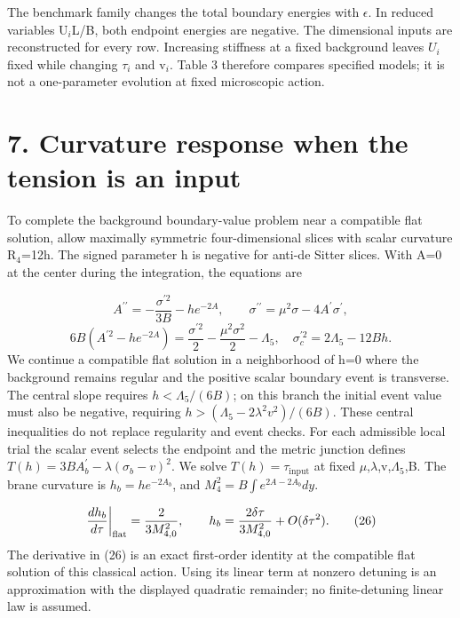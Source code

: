 \documentclass[11pt,a4paper]{article}
\begin{document}
The benchmark family changes the total boundary energies with \ensuremath{\epsilon}. In reduced variables U\ensuremath{{}_{i}}L/B, both endpoint energies are negative. The dimensional inputs are reconstructed for every row. Increasing stiffness at a fixed background leaves \ensuremath{U_i} fixed while changing \ensuremath{\tau}\ensuremath{{}_{i}} and v\ensuremath{{}_{i}}. Table 3 therefore compares specified models; it is not a one-parameter evolution at fixed microscopic action.

\section*{7. Curvature response when the tension is an input}
To complete the background boundary-value problem near a compatible flat solution, allow maximally symmetric four-dimensional slices with scalar curvature R\ensuremath{{}_{4}}=12h. The signed parameter h is negative for anti-de Sitter slices. With A=0 at the center during the integration, the equations are

\begin{equation}
A^{\prime\prime}=-\frac{\sigma^{\prime2}}{3B}-he^{-2A},\qquad \sigma^{\prime\prime}=\mu^2\sigma-4A^\prime\sigma^\prime,\tag{25a}
\end{equation}
\begin{equation}
6B(A^{\prime2}-he^{-2A})=\frac{\sigma^{\prime2}}{2}-\frac{\mu^2\sigma^2}{2}-\Lambda_5,\quad \sigma_c^{\prime2}=2\Lambda_5-12Bh.\tag{25b}
\end{equation}
We continue a compatible flat solution in a neighborhood of h=0 where the background remains regular and the positive scalar boundary event is transverse. The central slope requires \ensuremath{h<\Lambda_5/(6B)}; on this branch the initial event value must also be negative, requiring \ensuremath{h>(\Lambda_5-2\lambda^2v^2)/(6B)}. These central inequalities do not replace regularity and event checks. For each admissible local trial the scalar event selects the endpoint and the metric junction defines \ensuremath{T(h)=3BA_b^{\prime}-\lambda(\sigma_b-v)^2}. We solve \ensuremath{T(h)=\tau_{\mathrm{input}}} at fixed \ensuremath{\mu},\ensuremath{\lambda},v,\ensuremath{\Lambda}\ensuremath{{}_{5}},B. The brane curvature is \ensuremath{h_b=h e^{-2A_b}}, and \ensuremath{M_4^2=B\int e^{2A-2A_b}dy}.

\begin{equation}
\left.\frac{d h_b}{d\tau}\right|_{\rm flat}=\frac{2}{3M_{4,0}^2},\qquad h_b=\frac{2\delta\tau}{3M_{4,0}^2}+O(\delta\tau^2).\tag{26}
\end{equation}
The derivative in (26) is an exact first-order identity at the compatible flat solution of this classical action. Using its linear term at nonzero detuning is an approximation with the displayed quadratic remainder; no finite-detuning linear law is assumed.
\end{document}

